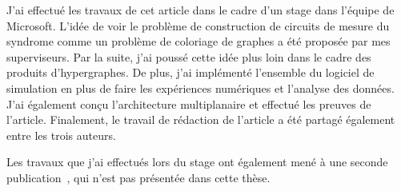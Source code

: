 J'ai effectué les travaux de cet article dans le cadre d'un stage 
dans l'équipe de Microsoft.
L'idée de voir le problème de construction de circuits de mesure du syndrome
comme un problème de coloriage de graphes a été proposée par mes superviseurs.
Par la suite,
j'ai poussé cette idée plus loin dans le cadre des produits d'hypergraphes.
De plus,
j'ai implémenté l'ensemble du logiciel de simulation en plus de faire les expériences numériques
et l'analyse des données.
J'ai également conçu l'architecture multiplanaire et effectué les preuves de l'article.
Finalement,
le travail de rédaction de l'article a été partagé également entre les trois auteurs.

Les travaux que j'ai effectués lors du stage ont également mené à une seconde 
publication~\cite{delfosse_bounds_2021},
qui n'est pas présentée dans cette thèse.



